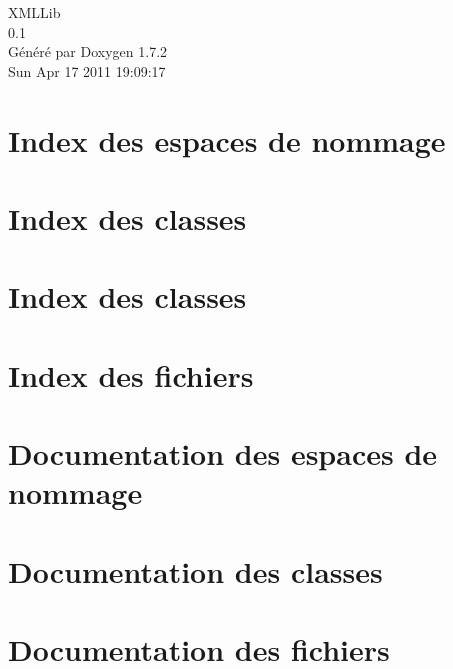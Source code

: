 \documentclass[a4paper]{book}
\begin{document}
\hypersetup{pageanchor=false}
\begin{titlepage}
\vspace*{7cm}
\begin{center}
{\Large XMLLib \\[1ex]\large 0.1 }\\
\vspace*{1cm}
{\large Généré par Doxygen 1.7.2}\\
\vspace*{0.5cm}
{\small Sun Apr 17 2011 19:09:17}\\
\end{center}
\end{titlepage}
\clearemptydoublepage
{}
\tableofcontents
\clearemptydoublepage
{}
\hypersetup{pageanchor=true}
\chapter{Index des espaces de nommage}

\chapter{Index des classes}

\chapter{Index des classes}

\chapter{Index des fichiers}

\chapter{Documentation des espaces de nommage}

\chapter{Documentation des classes}







\chapter{Documentation des fichiers}













\printindex
\end{document}
